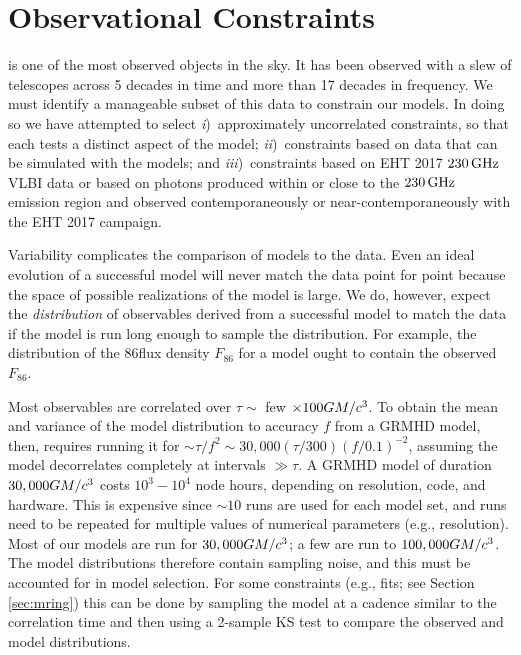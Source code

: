 \section{Observational Constraints}\label{sec:observations}

\sgra is one of the most observed objects in the sky.  It has been observed with a slew of telescopes across 5 decades in time and more than 17 decades in frequency. We must identify a manageable subset of this data to constrain our models. In doing so we have attempted to select
\emph{i})~approximately uncorrelated constraints, so that each tests a distinct aspect of the model;
\emph{ii})~constraints based on data that can be simulated with the models; and
\emph{iii})~constraints based on EHT 2017 $230\,\mathrm{GHz}$ VLBI data or based on photons produced within or close to the $230\,\mathrm{GHz}$ emission region and observed contemporaneously or near-contemporaneously with the EHT 2017 campaign.

Variability complicates the comparison of \sgra models to the data. Even an ideal evolution of a successful model will never match the data point for point because the space of possible realizations of the model is large.  We do, however, expect the {\em distribution} of  observables derived from a successful model to match the data if the model is run long enough to sample the distribution.  For example, the distribution of the 86\GHz flux density $F_{86}$ for a model ought to contain the observed $F_{86}$.

Most observables are correlated over $\tau\sim$ few $\times 100 GM/c^3$.  To obtain the mean and variance of the model distribution to accuracy $f$ from a GRMHD model, then, requires running it for $\sim \tau/f^2 \sim 30,000 (\tau/300) (f/0.1)^{-2}$, assuming the model decorrelates completely at intervals $\gg \tau$.  A GRMHD model of duration $30,000 GM/c^3$  costs $10^3-10^4$ node hours, depending on resolution, code, and hardware.  This is expensive since $\sim 10$ runs are used for each model set, and runs need to be repeated for multiple values of numerical parameters (e.g., resolution).  Most of our models are run for $30,000 GM/c^3$; a few are run to $100,000 GM/c^3$.  The model distributions therefore contain sampling noise, and this must be accounted for in model selection.  For some  constraints (e.g., \mring fits; see Section \ref{sec:mring}) this can be done by sampling the model at a cadence similar to the correlation time and then using a 2-sample KS test to compare the observed and model distributions.

